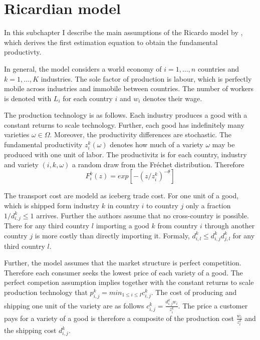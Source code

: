 \section{Ricardian model}
\label{sec:Ricardo}
In this subchapter I describe the main assumptions of the Ricardo model by \parencite{Costinot}, which derives the first estimation equation to obtain the fundamental productivty. \par In general, the model considers a world economy of  $i = 1, \dots, n$ countries and $k = 1, \dots , K $ industries. The sole factor of production is labour, which is perfectly mobile across industries and immobile between countries. The number of workers is denoted with $L_i $ for each country $i$  and $w_i$ denotes their wage. \par %
The production technology is as follows.
 Each industry produces a good with a constant returns to scale technology.
 Further, each good has indefinitely many varieties $\omega \in \Omega$. 
 Moreover, the  productivity differences are stochastic.
  The fundamental productivity $z_i^k(\omega)$ denotes how much of a variety $\omega$ may be produced with one unit of labor. 
  The productivitz  is for each country, industry and variety $(i,k,\omega)$ a random draw from the Fr{\'e}chet distribution. Therefore \[ F^k_i (z) = exp [-(z/z^{k}_i )^{-\theta} ] \] \par
The transport cost are modeld as iceberg trade cost.
For one unit of a good, which is shipped form industry $k$ in country $i$ to country $j$ only a fraction $1/d^k_{i,j} \leq 1$ arrives.
Further the authors assume that no cross-country is possible. 
There for any third country $l$ importing a good $k$ from country $i$ through another country $j$ is more costly than directly importing it. 
Formaly, $d^k_{i,l} \leq d^k_{i,j} d^k_{j,l} $ for any third country $l$. \par
Further, the model assumes that the market structure is perfect competition.
Therefore each consumer seeks the lowest price of each variety of a good.
The perfect competion assumption implies together with the constant returns to scale production technology that $p^k_{i,j}=min_{1 \leq i \leq I}c^k_{i,j}$.
The cost of producing and shipping one unit of the variety are as follows $c^k_{i,j}=\frac{d^k_{i,j} w_i}{z_i^k}$.
The price a customer pays for a variety of a good is therefore a composite of the production cost $\frac{w_i}{z_i^k}$
and the shipping cost $d^k_{i,j}$.  \par
